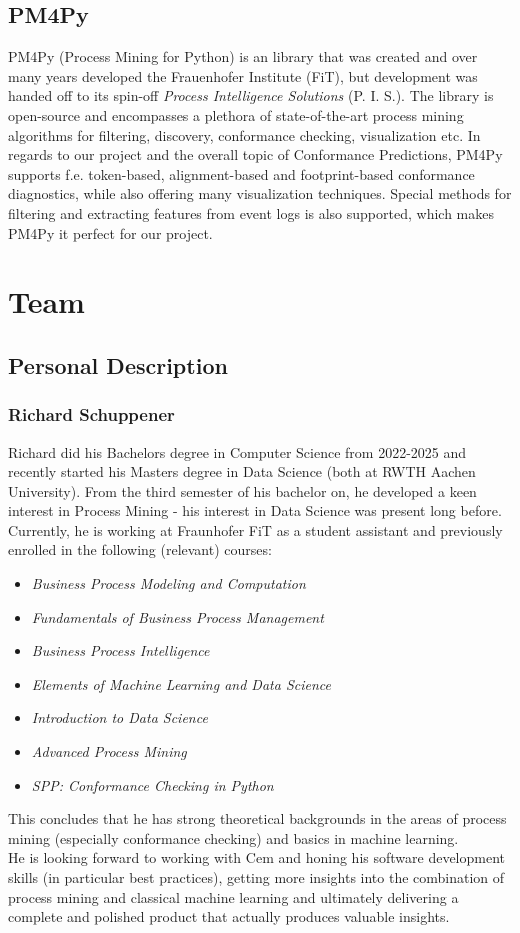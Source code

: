 \documentclass[12pt,a4paper]{article}
\begin{document}
\subsection{PM4Py}
PM4Py (Process Mining for Python) \cite{pm4py2023} is an library that was created and over many years developed the Frauenhofer Institute (FiT), but development was handed off to its spin-off \textit{Process Intelligence Solutions} (P. I. S.). The library is open-source and encompasses a plethora of state-of-the-art process mining algorithms for filtering, discovery, conformance checking, visualization etc. In regards to our project and the overall topic of Conformance Predictions, PM4Py supports f.e. token-based, alignment-based and footprint-based conformance diagnostics, while also offering many visualization techniques. Special methods for filtering and extracting features from event logs is also supported, which makes PM4Py it perfect for our project.

\section{Team}
\subsection{Personal Description}
\subsubsection{Richard Schuppener}
Richard did his Bachelors degree in Computer Science from 2022-2025 and recently started his Masters degree in Data Science (both at RWTH Aachen University). From the third semester of his bachelor on, he developed a keen interest in Process Mining - his interest in Data Science was present long before. Currently, he is working at Fraunhofer FiT as a student assistant and previously enrolled in the following (relevant) courses:
\begin{itemize} 
	\item \textit{Business Process Modeling and Computation}
	\item \textit{Fundamentals of Business Process Management}
	\item \textit{Business Process Intelligence}
	\item \textit{Elements of Machine Learning and Data Science}
	\item \textit{Introduction to Data Science}
	\item \textit{Advanced Process Mining}
	\item \textit{SPP: Conformance Checking in Python}
\end{itemize}
This concludes that he has strong theoretical backgrounds in the areas of process mining (especially conformance checking) and basics in machine learning. \\
He is looking forward to working with Cem and honing his software development skills (in particular best practices), getting more insights into the combination of process mining and classical machine learning and ultimately delivering a complete and polished product that actually produces valuable insights.
\end{document}
